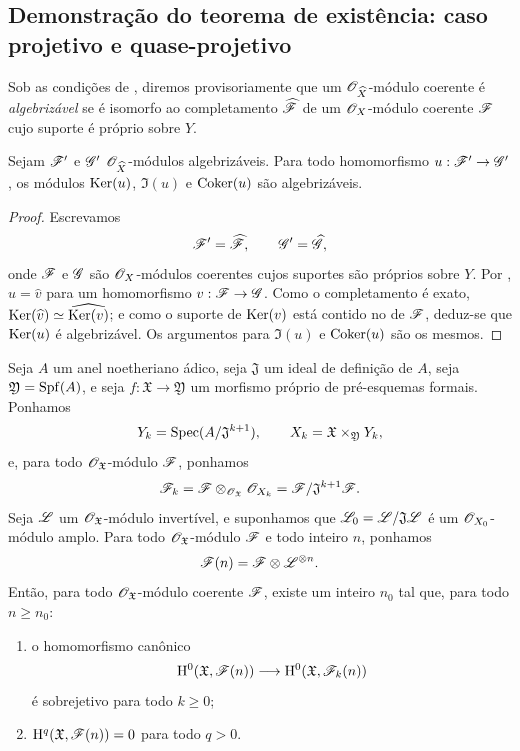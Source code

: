 \subsection{Demonstração do teorema de existência: caso projetivo e quase-projetivo}
\label{subsection:III.5.2}

\begin{env}[5.2.1]
\label{III.5.2.1}
Sob as condições de , diremos
provisoriamente que um $\mathscr{O}_{\widehat{X}}$-módulo coerente é
\emph{algebrizável} se é isomorfo ao completamento
$\widehat{\mathscr{F}}$ de um $\mathscr{O}_X$-módulo coerente $\mathscr{F}$ cujo
suporte é próprio sobre $Y$.
\end{env}

\begin{lemma}[5.2.2]
\label{III.5.2.2}
Sejam $\mathscr{F}'$ e $\mathscr{G}'$ $\mathscr{O}_{\widehat{X}}$-módulos
algebrizáveis. Para todo homomorfismo
$u:\sh{F}'\to\sh{G}'$, os módulos
$\operatorname{Ker}(u)$, $\Im(u)$ e $\operatorname{Coker}(u)$ são algebrizáveis.
\end{lemma}

\begin{proof}
Escrevamos
\[
  \mathscr{F}'=\widehat{\mathscr{F}},\qquad
  \mathscr{G}'=\widehat{\mathscr{G}},
\]
onde $\mathscr{F}$ e $\mathscr{G}$ são $\mathscr{O}_X$-módulos coerentes cujos
suportes são próprios sobre $Y$. Por ,
$u=\widehat{v}$ para um homomorfismo
$v:\sh{F}\to\sh{G}$. Como o completamento é exato,
$\operatorname{Ker}(\widehat{v})\simeq\widehat{\operatorname{Ker}(v)}$; e como o suporte
de $\operatorname{Ker}(v)$ está contido no de $\mathscr{F}$, deduz-se que
$\operatorname{Ker}(u)$ é algebrizável. Os argumentos para $\Im(u)$ e
$\operatorname{Coker}(u)$ são os mesmos.
\end{proof}

\begin{proposition}[5.2.3]
\label{III.5.2.3}
Seja $A$ um anel noetheriano ádico, seja $\mathfrak{J}$ um ideal de
definição de $A$, seja $\mathfrak{Y}=\operatorname{Spf}(A)$, e seja
$f:\mathfrak{X}\to\mathfrak{Y}$ um morfismo próprio de pré-esquemas
formais. Ponhamos
\[
  Y_k=\operatorname{Spec}(A/\mathfrak{J}^{k+1}),\qquad
  X_k=\mathfrak{X}\times_{\mathfrak{Y}}Y_k,
\]
e, para todo $\mathscr{O}_{\mathfrak{X}}$-módulo $\mathscr{F}$, ponhamos
\[
  \mathscr{F}_k
  =
  \mathscr{F}\otimes_{\mathscr{O}_{\mathfrak{X}}}\mathscr{O}_{X_k}
  =
  \mathscr{F}/\mathfrak{J}^{k+1}\mathscr{F}.
\]
Seja $\mathscr{L}$ um $\mathscr{O}_{\mathfrak{X}}$-módulo invertível, e
suponhamos que
$\mathscr{L}_0=\mathscr{L}/\mathfrak{J}\mathscr{L}$ é um
$\mathscr{O}_{X_0}$-módulo amplo. Para todo
$\mathscr{O}_{\mathfrak{X}}$-módulo $\mathscr{F}$ e todo inteiro $n$, ponhamos
\[
  \mathscr{F}(n)=\mathscr{F}\otimes\mathscr{L}^{\otimes n}.
\]
Então, para todo $\mathscr{O}_{\mathfrak{X}}$-módulo coerente $\mathscr{F}$,
existe um inteiro $n_0$ tal que, para todo $n\geq n_0$:
\begin{enumerate}
  \item[\rm{(i)}] o homomorfismo canônico
    \[
      \mathrm{H}^0(\mathfrak{X},\mathscr{F}(n))
      \longrightarrow
      \mathrm{H}^0(\mathfrak{X},\mathscr{F}_k(n))
    \]
    é sobrejetivo para todo $k\geq0$;
  \item[\rm{(ii)}]
    $\mathrm{H}^q(\mathfrak{X},\mathscr{F}(n))=0$ para todo $q>0$.
\end{enumerate}
\end{proposition}


